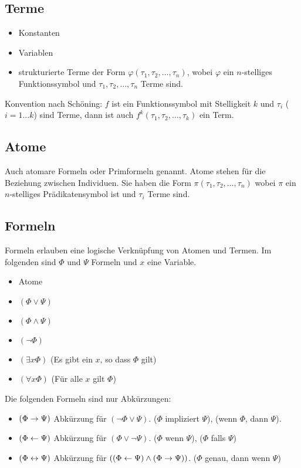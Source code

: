 \documentclass[a4paper,twoside,DIV15,BCOR12mm]{scrbook}
\begin{document}
\subsection{Terme}
\begin{itemize}
\item Konstanten
\item Variablen
\item strukturierte Terme der Form $\varphi(\tau_1,\tau_2,\ldots,\tau_n)$, wobei $\varphi$ ein $n$-stelliges Funktionssymbol und $\tau_1,\tau_2,\ldots,\tau_n$ Terme sind.
\end{itemize}

Konvention nach Schöning: $f$ ist ein Funktionssymbol mit Stelligkeit $k$ und $\tau_i$ ($i=1\ldots k$) sind Terme, dann ist auch $f^k(\tau_1,\tau_2,\ldots,\tau_k)$ ein Term.

\subsection{Atome}
Auch atomare Formeln oder Primformeln genannt. Atome stehen für die Beziehung zwischen Individuen. Sie haben die Form $\pi(\tau_1,\tau_2,\ldots,\tau_n)$ wobei $\pi$ ein $n$-stelliges Prädikatensymbol ist und $\tau_i$ Terme sind.

\subsection{Formeln}
Formeln erlauben eine logische Verknüpfung von Atomen und Termen. Im folgenden sind $\Phi$ und $\Psi$ Formeln und $x$ eine Variable.

\begin{itemize}
\item Atome
\item $(\Phi \vee \Psi)$
\item $(\Phi \wedge \Psi)$
\item $(\neg \Phi)$
\item $(\exists x \Phi)$ (\glqq Es gibt ein $x$, so dass $\Phi$ gilt\grqq)
\item $(\forall x \Phi)$ (\glqq Für alle $x$ gilt $\Phi$\grqq)
\end{itemize}

Die folgenden Formeln sind nur Abkürzungen:
\begin{itemize}
\item $(\Phi \rightarrow \Psi)$ Abkürzung für $(\neg \Phi \vee \Psi)$.
 (\glqq $\Phi$ impliziert $\Psi$\grqq), (\glqq wenn $\Phi$, dann $\Psi$\grqq).
\item $(\Phi \leftarrow \Psi)$ Abkürzung für $(\Phi \vee \neg \Psi)$. (\glqq $\Phi$ wenn $\Psi$\grqq), (\glqq $\Phi$ falls $\Psi$\grqq) 
\item $(\Phi \leftrightarrow \Psi)$ Abkürzung für $((\Phi \leftarrow \Psi)\wedge(\Phi\rightarrow\Psi))$. (\glqq $\Phi$ genau, dann wenn $\Psi$\grqq)
\end{itemize}
\end{document}
